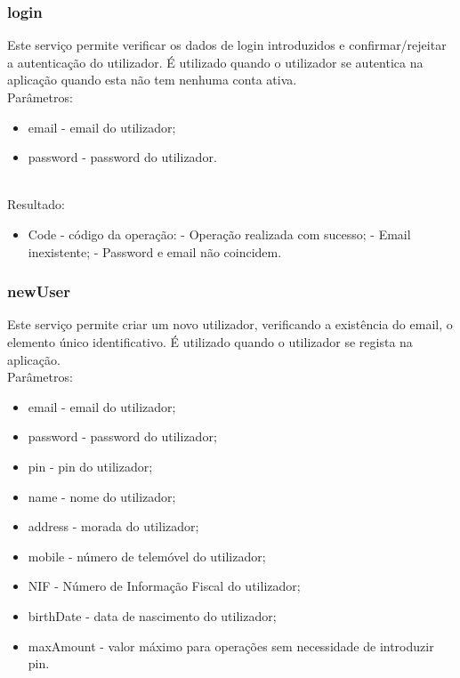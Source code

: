 \subsubsection{login}

Este serviço permite verificar os dados de login introduzidos e confirmar/rejeitar a autenticação do utilizador. É utilizado quando o utilizador se autentica na aplicação quando esta não tem nenhuma conta ativa.
\newline
~\\Parâmetros:
\begin{itemize}
\item email - email do utilizador;
\item password - password do utilizador.
\end{itemize}

~\\Resultado:
\begin{itemize}
\item Code - código da operação:
 - Operação realizada com sucesso;
 - Email inexistente;
 - Password e email não coincidem.
\end{itemize}

\subsubsection{newUser}

Este serviço permite criar um novo utilizador, verificando a existência do email, o elemento único identificativo. É utilizado quando o utilizador se regista na aplicação.
\newline
~\\Parâmetros:
\begin{itemize}
\item email - email do utilizador;
\item password - password do utilizador;
\item pin - pin do utilizador;
\item name - nome do utilizador;
\item address - morada do utilizador;
\item mobile - número de telemóvel do utilizador;
\item NIF - Número de Informação Fiscal do utilizador;
\item birthDate - data de nascimento do utilizador;
\item maxAmount - valor máximo para operações sem necessidade de introduzir pin.
\end{itemize}

